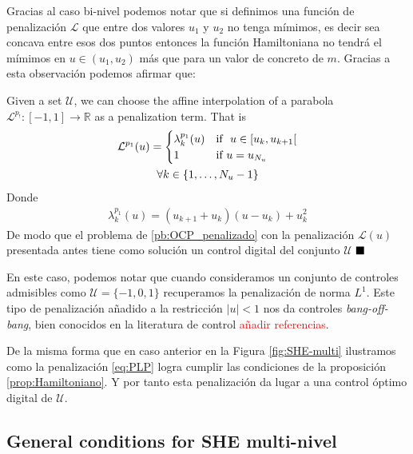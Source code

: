 Gracias al caso bi-nivel podemos notar que si definimos una función de penalización $\mathcal{L}$ que entre dos valores $u_1$ y $u_2$ no tenga mímimos, es decir sea concava entre esos dos puntos entonces la función Hamiltoniana no tendrá el mímimos en $u \in (u_1,u_2)$ más que para un valor de concreto de $m$. Gracias a esta observación podemos afirmar que:

\vspace{1em}
\begin{theorem}\label{th:PLP}
    Given a set $\mathcal{U}$, we can choose the affine interpolation of a parabola $\mathcal{L}^{p_!}:[-1,1] \rightarrow \mathbb{R}$ as a penalization term. That is
    \begin{gather}\label{eq:PLP}
        \mathcal{L}^{p_1}(u) = \begin{cases}
            \lambda_k^{p_1}(u) & \text{if }  u \in [u_k,u_{k+1}[ \\
            1 & \text{if } u = u_{N_u} 
        \end{cases} \\
        \notag \forall k \in \{1,\dots,N_u-1\} 
    \end{gather}
    Donde 
    \begin{gather}
        \lambda_k^{p_1}(u) = (u_{k+1}+u_{k}) (u-u_k) + u_k^2
    \end{gather}
    De modo que el problema de \ref{pb:OCP_penalizado} con la penalización $\mathcal{L}(u)$ presentada antes tiene como solución un control digital del conjunto $\mathcal{U}$
    $\hfill \blacksquare$ 
\end{theorem}
\vspace{1em}
\begin{remark}
    En este caso, podemos notar que cuando consideramos un conjunto de controles admisibles como $\mathcal{U}= \{-1,0,1\}$ recuperamos la penalización de norma $L^1$. Este tipo de penalización añadido a la restricción $|u|<1$ nos da controles \emph{bang-off-bang}, bien conocidos en la literatura de control \textcolor{red}{añadir referencias}.
\end{remark}

De la misma forma que en caso anterior en la Figura \ref{fig:SHE-multi} ilustramos como la penalización \eqref{eq:PLP} logra cumplir las condiciones de la proposición \ref{prop:Hamiltoniano}. Y por tanto esta penalización da lugar a una control óptimo digital de $\mathcal{U}$. 


\subsection{General conditions for  SHE multi-nivel}   

